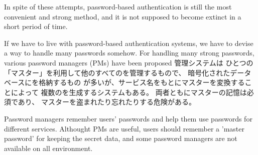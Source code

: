 \documentclass{article}
\begin{document}

In spite of these attempts,
password-based authentication is still the most
convenient and strong method\cite{Bonneau},
and it is not supposed to become extinct
in a short period of time\cite{Herley:2009:PSS:1601990.1602010}.



If we have to live with password-based authentication systems,
we have to devise a way to handle many passwords somehow.
For handling many strong passwords,
various password managers (PMs) have been proposed
{\PW}管理システムは
ひとつの「マスター{\PW}」を利用して他のすべての{\PW}を管理するもので、
暗号化されたデータベースに{\PW}を格納するもの%
\cite{OnePassword}%
\cite{Dashlane}%
\cite{ミルパス}%
\cite{LastPass}%
\cite{KeyPass}%
\cite{NortonIDSafe}%
\cite{IDManager}%
が多いが、サービス名をもとにマスター{\PW}を変換することによって
複数の{\PW}を生成するシステム\cite{SuperGenPass}もある。
両者ともにマスター{\PW}の記憶は必須であり、
マスター{\PW}を盗まれたり忘れたりする危険がある。

Password managers remember users' passwords and help them use passwords for different services.
Althought PMs are useful, users should remember a 'master password' for
keeping the secret data, and
some password managers are not available on all environment.


%
\end{document}

